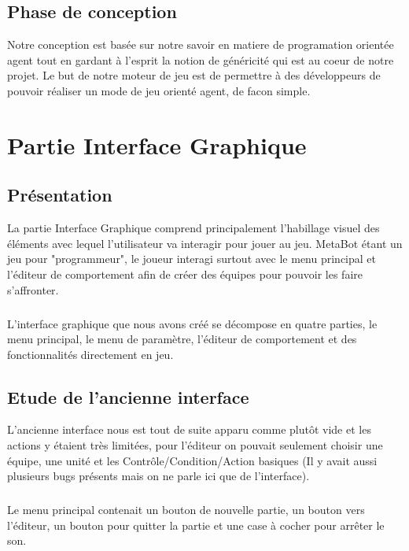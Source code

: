 \documentclass{report}
\begin{document}
\section{Phase de conception}
Notre conception est basée sur notre savoir en matiere de programation orientée agent tout en gardant à l'esprit la notion de généricité qui est au coeur de notre projet.
Le but de notre moteur de jeu est de permettre à des développeurs de pouvoir réaliser un mode de jeu orienté agent, de facon simple.
\newpage
\chapter{Partie Interface Graphique}
\section{Présentation}
La partie Interface Graphique comprend principalement l'habillage visuel des éléments avec lequel l'utilisateur va interagir pour jouer au jeu. MetaBot étant un jeu pour "programmeur", le joueur interagi surtout avec le menu principal et l'éditeur de comportement afin de créer des équipes pour pouvoir les faire s'affronter.
\paragraph{}
L'interface graphique que nous avons créé se décompose en quatre parties, le menu principal, le menu de paramètre, l'éditeur de comportement et des fonctionnalités directement en jeu.
\section{Etude de l'ancienne interface}
L'ancienne interface nous est tout de suite apparu comme plutôt vide et les actions y étaient très limitées, pour l'éditeur on pouvait seulement choisir une équipe, une unité et les Contrôle/Condition/Action basiques (Il y avait aussi plusieurs bugs présents mais on ne parle ici que de l'interface).
\paragraph{}
Le menu principal contenait un bouton de nouvelle partie, un bouton vers l'éditeur, un bouton pour quitter la partie et une case à cocher pour arrêter le son.
\paragraph{}
\end{document}
